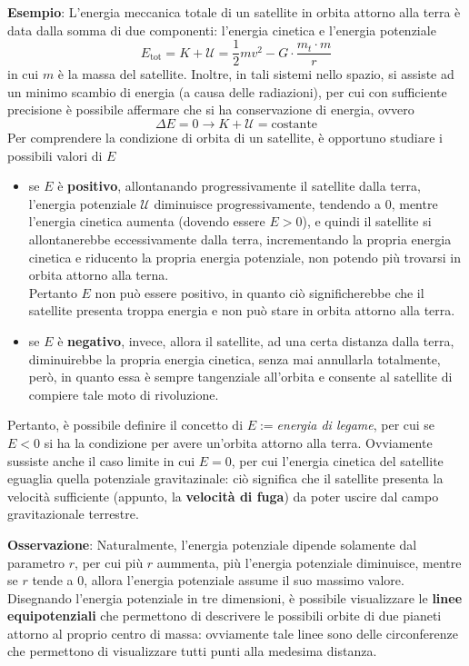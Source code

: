 \documentclass[a4paper]{extarticle}
\begin{document}
\vspace{1em}
\noindent
\textbf{Esempio}: L'energia meccanica totale di un satellite in orbita attorno alla terra è data dalla somma di due componenti: l'energia cinetica e l'energia potenziale
\[E_{\text{tot}} = K+\mathcal{U}=\frac{1}{2}mv^2 - G \cdot \frac{m_t \cdot m}{r}\]
in cui $m$ è la massa del satellite. Inoltre, in tali sistemi nello spazio, si assiste ad un minimo scambio di energia (a causa delle radiazioni), per cui con sufficiente precisione è possibile affermare che si ha conservazione di energia, ovvero
\[\Delta E = 0 \longrightarrow K+\mathcal{U}=\text{costante}\]
Per comprendere la condizione di orbita di un satellite, è opportuno studiare i possibili valori di $E$
\begin{itemize}
  \item se $E$ è \textbf{positivo}, allontanando progressivamente il satellite dalla terra, l'energia potenziale $\mathcal{U}$ diminuisce progressivamente, tendendo a $0$, mentre l'energia cinetica aumenta (dovendo essere $E>0$), e quindi il satellite si allontanerebbe eccessivamente dalla terra, incrementando la propria energia cinetica e riducento la propria energia potenziale, non potendo più trovarsi in orbita attorno alla terna.\\
  Pertanto $E$ non può essere positivo, in quanto ciò significherebbe che il satellite presenta troppa energia e non può stare in orbita attorno alla terra.
  \item se $E$ è \textbf{negativo}, invece, allora il satellite, ad una certa distanza dalla terra, diminuirebbe la propria energia cinetica, senza mai annullarla totalmente, però, in quanto essa è sempre tangenziale all'orbita e consente al satellite di compiere tale moto di rivoluzione.
\end{itemize}
Pertanto, è possibile definire il concetto di \emph{$E:=$energia di legame}, per cui se $E < 0$ si ha la condizione per avere un'orbita attorno alla terra. Ovviamente sussiste anche il caso limite in cui $E=0$, per cui l'energia cinetica del satellite eguaglia quella potenziale gravitazinale: ciò significa che il satellite presenta la velocità sufficiente (appunto, la \textbf{velocità di fuga}) da poter uscire dal campo gravitazionale terrestre.

\vspace{1em}
\noindent
\textbf{Osservazione}: Naturalmente, l'energia potenziale dipende solamente dal parametro $r$, per cui più $r$ aummenta, più l'energia potenziale diminuisce, mentre se $r$ tende a $0$, allora l'energia potenziale assume il suo massimo valore.\\
Disegnando l'energia potenziale in tre dimensioni, è possibile visualizzare le \textbf{linee equipotenziali} che permettono di descrivere le possibili orbite di due pianeti attorno al proprio centro di massa: ovviamente tale linee sono delle circonferenze che permettono di visualizzare tutti punti alla medesima distanza.
\end{document}
